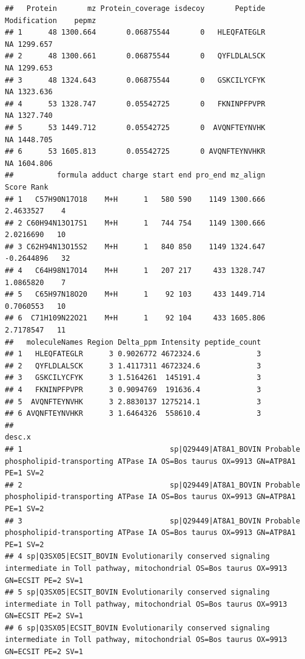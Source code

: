 \documentclass[
]{article}
\begin{document}
\begin{verbatim}
##   Protein       mz Protein_coverage isdecoy       Peptide Modification    pepmz
## 1      48 1300.664       0.06875544       0   HLEQFATEGLR           NA 1299.657
## 2      48 1300.661       0.06875544       0   QYFLDLALSCK           NA 1299.653
## 3      48 1324.643       0.06875544       0   GSKCILYCFYK           NA 1323.636
## 4      53 1328.747       0.05542725       0   FKNINPFPVPR           NA 1327.740
## 5      53 1449.712       0.05542725       0  AVQNFTEYNVHK           NA 1448.705
## 6      53 1605.813       0.05542725       0 AVQNFTEYNVHKR           NA 1604.806
##          formula adduct charge start end pro_end mz_align      Score Rank
## 1   C57H90N17O18    M+H      1   580 590    1149 1300.666  2.4633527    4
## 2 C60H94N13O17S1    M+H      1   744 754    1149 1300.666  2.0216690   10
## 3 C62H94N13O15S2    M+H      1   840 850    1149 1324.647 -0.2644896   32
## 4   C64H98N17O14    M+H      1   207 217     433 1328.747  1.0865820    7
## 5   C65H97N18O20    M+H      1    92 103     433 1449.714  0.7060553   10
## 6  C71H109N22O21    M+H      1    92 104     433 1605.806  2.7178547   11
##   moleculeNames Region Delta_ppm Intensity peptide_count
## 1   HLEQFATEGLR      3 0.9026772 4672324.6             3
## 2   QYFLDLALSCK      3 1.4117311 4672324.6             3
## 3   GSKCILYCFYK      3 1.5164261  145191.4             3
## 4   FKNINPFPVPR      3 0.9094769  191636.4             3
## 5  AVQNFTEYNVHK      3 2.8830137 1275214.1             3
## 6 AVQNFTEYNVHKR      3 1.6464326  558610.4             3
##                                                                                                                                          desc.x
## 1                                  sp|Q29449|AT8A1_BOVIN Probable phospholipid-transporting ATPase IA OS=Bos taurus OX=9913 GN=ATP8A1 PE=1 SV=2
## 2                                  sp|Q29449|AT8A1_BOVIN Probable phospholipid-transporting ATPase IA OS=Bos taurus OX=9913 GN=ATP8A1 PE=1 SV=2
## 3                                  sp|Q29449|AT8A1_BOVIN Probable phospholipid-transporting ATPase IA OS=Bos taurus OX=9913 GN=ATP8A1 PE=1 SV=2
## 4 sp|Q3SX05|ECSIT_BOVIN Evolutionarily conserved signaling intermediate in Toll pathway, mitochondrial OS=Bos taurus OX=9913 GN=ECSIT PE=2 SV=1
## 5 sp|Q3SX05|ECSIT_BOVIN Evolutionarily conserved signaling intermediate in Toll pathway, mitochondrial OS=Bos taurus OX=9913 GN=ECSIT PE=2 SV=1
## 6 sp|Q3SX05|ECSIT_BOVIN Evolutionarily conserved signaling intermediate in Toll pathway, mitochondrial OS=Bos taurus OX=9913 GN=ECSIT PE=2 SV=1

\end{verbatim}
\end{document}
